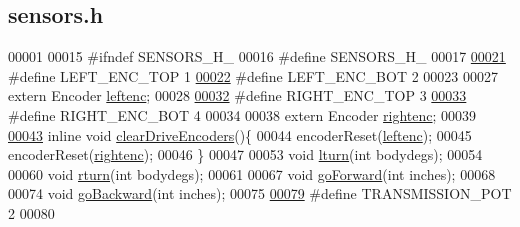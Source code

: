 \hypertarget{sensors_8h_source}{}\subsection{sensors.\+h}
\label{sensors_8h_source}

\begin{DoxyCode}
00001 
00015 \textcolor{preprocessor}{#ifndef SENSORS\_H\_}
00016 \textcolor{preprocessor}{#define SENSORS\_H\_}
00017 
\hypertarget{sensors_8h_source.tex_l00021}{}\hyperlink{sensors_8h_ad0ae0aded49835e75c52bc506585f5a6}{00021} \textcolor{preprocessor}{#define LEFT\_ENC\_TOP 1}
\hypertarget{sensors_8h_source.tex_l00022}{}\hyperlink{sensors_8h_ae913e0b80ef027d0a619e59a3d2ffb85}{00022} \textcolor{preprocessor}{#define LEFT\_ENC\_BOT 2}
00023 
00027 \textcolor{keyword}{extern} Encoder \hyperlink{sensors_8h_a48ead63071a2b65b87a166928a5a5c08}{leftenc};
00028 
\hypertarget{sensors_8h_source.tex_l00032}{}\hyperlink{sensors_8h_a07c1c0ceab9fee6088955b2b2706e515}{00032} \textcolor{preprocessor}{#define RIGHT\_ENC\_TOP 3}
\hypertarget{sensors_8h_source.tex_l00033}{}\hyperlink{sensors_8h_a76290ef36d8c093e1d380e26d1d01f6a}{00033} \textcolor{preprocessor}{#define RIGHT\_ENC\_BOT 4}
00034 
00038 \textcolor{keyword}{extern} Encoder \hyperlink{sensors_8h_a8c853ba918673c4878ab6935c54969e4}{rightenc};
00039 
\hypertarget{sensors_8h_source.tex_l00043}{}\hyperlink{sensors_8h_acdacd94315ad0d5b73d99eaed29be5f5}{00043} \textcolor{keyword}{inline} \textcolor{keywordtype}{void} \hyperlink{sensors_8h_acdacd94315ad0d5b73d99eaed29be5f5}{clearDriveEncoders}()\{
00044     encoderReset(\hyperlink{sensors_8h_a48ead63071a2b65b87a166928a5a5c08}{leftenc});
00045     encoderReset(\hyperlink{sensors_8h_a8c853ba918673c4878ab6935c54969e4}{rightenc});
00046 \}
00047 
00053 \textcolor{keywordtype}{void} \hyperlink{sensors_8h_a6c61a5584d9cf1eaac994e0fb9f6b61c}{lturn}(\textcolor{keywordtype}{int} bodydegs);
00054 
00060 \textcolor{keywordtype}{void} \hyperlink{sensors_8h_ad701efe604d40c13910416224d3dd9e3}{rturn}(\textcolor{keywordtype}{int} bodydegs);
00061 
00067 \textcolor{keywordtype}{void} \hyperlink{sensors_8h_aac3aa2a1f6d4df8618c2e95a99f69bd5}{goForward}(\textcolor{keywordtype}{int} inches);
00068 
00074 \textcolor{keywordtype}{void} \hyperlink{sensors_8h_a588c302940f0bd83c1f7f7fef3447171}{goBackward}(\textcolor{keywordtype}{int} inches);
00075 
\hypertarget{sensors_8h_source.tex_l00079}{}\hyperlink{sensors_8h_a4df8b77c0d00d0604d3e8d0fd5fa5d40}{00079} \textcolor{preprocessor}{#define TRANSMISSION\_POT 2}
00080 

\end{DoxyCode}
